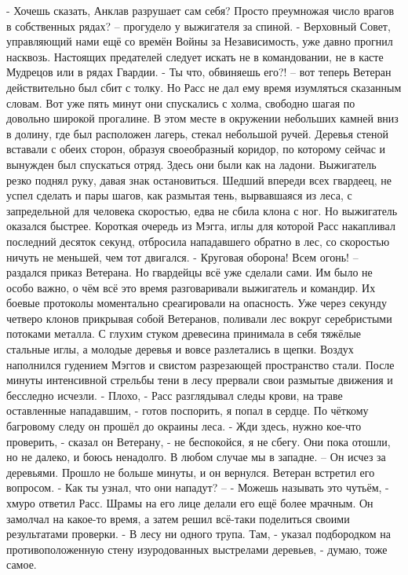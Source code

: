 \documentclass[a4paper, 12pt]{report}
\begin{document}
- Хочешь сказать, Анклав разрушает сам себя? Просто преумножая число врагов в собственных рядах? – прогудело у выжигателя за спиной.
- Верховный Совет, управляющий нами ещё со времён Войны за Независимость, уже давно прогнил насквозь. Настоящих предателей следует искать не в командовании, не в касте Мудрецов или в рядах Гвардии.
- Ты что, обвиняешь его?! – вот теперь Ветеран действительно был сбит с толку.
Но Расс не дал ему время изумляться сказанным словам. 
Вот уже пять минут они спускались с холма, свободно шагая по довольно широкой прогалине. В этом месте в окружении небольших камней вниз в долину, где был расположен лагерь, стекал небольшой ручей. Деревья стеной вставали с обеих сторон, образуя своеобразный коридор, по которому сейчас и вынужден был спускаться отряд. Здесь они были как на ладони.	
Выжигатель резко поднял руку, давая знак остановиться. Шедший впереди всех гвардеец, не успел сделать и пары шагов, как размытая тень, вырвавшаяся из леса, с запредельной для человека скоростью, едва не сбила клона с ног. Но выжигатель оказался быстрее. Короткая очередь из Мэгга, иглы для которой Расс накапливал последний десяток секунд, отбросила нападавшего обратно в лес, со скоростью ничуть не меньшей, чем тот двигался.
- Круговая оборона! Всем огонь! – раздался приказ Ветерана. Но гвардейцы всё уже сделали сами. Им было не особо важно, о чём всё это время разговаривали выжигатель и командир. Их боевые протоколы моментально среагировали на опасность. Уже через секунду четверо клонов прикрывая собой Ветеранов, поливали лес вокруг серебристыми потоками металла. С глухим стуком древесина принимала в себя тяжёлые стальные иглы, а молодые деревья и вовсе разлетались в щепки. Воздух наполнился гудением Мэггов и свистом разрезающей пространство стали. После минуты интенсивной стрельбы тени в лесу прервали свои размытые движения и бесследно исчезли.
- Плохо, - Расс разглядывал следы крови, на траве оставленные нападавшим, - готов поспорить, я попал в сердце. 
По чёткому багровому следу он прошёл до окраины леса.
- Жди здесь, нужно кое-что проверить, - сказал он Ветерану, - не беспокойся, я не сбегу. Они пока отошли, но не далеко, и боюсь ненадолго. В любом случае мы в западне. –
Он исчез за деревьями. Прошло не больше минуты, и он вернулся. Ветеран встретил его вопросом.
- Как ты узнал, что они нападут? – 
- Можешь называть это чутьём, - хмуро ответил Расс. Шрамы на его лице делали его ещё более мрачным. Он замолчал на какое-то время, а затем решил всё-таки поделиться своими результатами проверки. 
- В лесу ни одного трупа. Там, - указал подбородком на противоположенную стену изуродованных выстрелами деревьев, - думаю, тоже самое.
\end{document}
